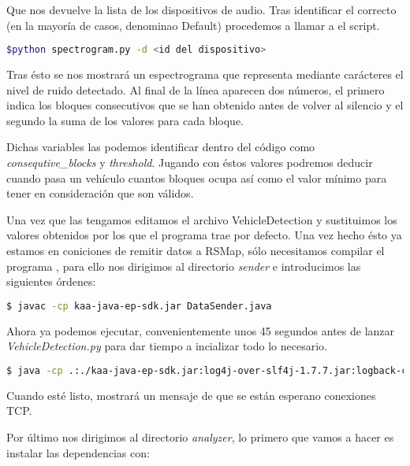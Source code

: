 Que nos devuelve la lista de los dispositivos de audio. Tras identificar el correcto (en la mayoría de casos, denominao Default) procedemos a llamar a el script.

\begin{lstlisting}[language=bash,caption={Ejecutar la aplicación de configuración},label={lst:pi1}]
$python spectrogram.py -d <id del dispositivo>
\end{lstlisting}

Tras ésto se nos mostrará un espectrograma que representa mediante carácteres el nivel de ruido detectado. Al final de la línea aparecen dos números, el primero indica los bloques consecutivos que se han obtenido antes de volver al silencio y el segundo la suma de los valores para cada bloque.

Dichas variables las podemos identificar dentro del código como
\textit{consequtive\_blocks} y \textit{threshold}. Jugando con éstos valores podremos deducir cuando pasa un vehículo cuantos bloques ocupa así como el valor mínimo para tener en consideración que son válidos.

\bigskip

Una vez que las tengamos editamos el archivo VehicleDetection y sustituimos los valores obtenidos por los que el programa trae por defecto. Una vez hecho ésto ya estamos en coniciones de remitir datos a RSMap, sólo necesitamos compilar el programa , para ello nos dirigimos al directorio \textit{sender} e introducimos las siguientes órdenes:

\begin{lstlisting}[language=bash,caption={Compilar DataSender.java},label={lst:pi1}]
$ javac -cp kaa-java-ep-sdk.jar DataSender.java
\end{lstlisting}

Ahora ya podemos ejecutar, convenientemente unos 45 segundos antes de lanzar \textit{VehicleDetection.py} para dar tiempo a incializar todo lo necesario.

\begin{lstlisting}[language=bash,caption={Lanzar DataSender},label={lst:pi1}]
$ java -cp .:./kaa-java-ep-sdk.jar:log4j-over-slf4j-1.7.7.jar:logback-classic-1.1.2.jar:logback-core-1.1.2.jar DataSender
\end{lstlisting}

Cuando esté listo, mostrará un mensaje de que se están esperano conexiones TCP.

Por último nos dirigimos al directorio \textit{analyzer}, lo primero que vamos a hacer es instalar las dependencias con:

